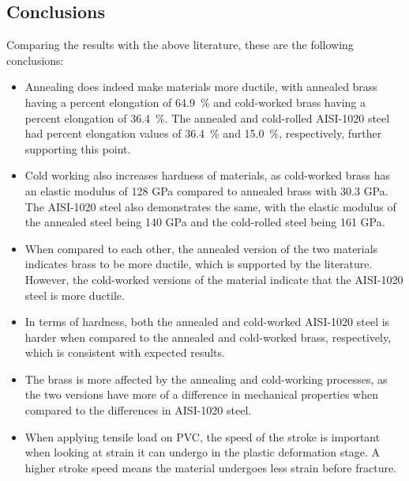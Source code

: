 \documentclass[11pt]{article}
\begin{document}
        \subsection{Conclusions}
            Comparing the results with the above literature, these are the following conclusions:
            \begin{itemize}
                \item 
                Annealing does indeed make materials more ductile, with annealed brass having a percent elongation of \SI{64.9}{\percent} and cold-worked brass having a percent elongation of \SI{36.4}{\percent}. 
                The annealed and cold-rolled AISI-1020 steel had percent elongation values of \SI{36.4}{\percent} and \SI{15.0}{\percent}, respectively, further supporting this point.
                \item 
                Cold working also increases hardness of materials, as cold-worked brass has an elastic modulus of 128 GPa compared to annealed brass with 30.3 GPa. 
                The AISI-1020 steel also demonstrates the same, with the elastic modulus of the annealed steel being 140 GPa and the cold-rolled steel being 161 GPa.
                \item 
                When compared to each other, the annealed version of the two materials indicates brass to be more ductile, which is supported by the literature. 
                However, the cold-worked versions of the material indicate that the AISI-1020 steel is more ductile.
                \item 
                In terms of hardness, both the annealed and cold-worked AISI-1020 steel is harder when compared to the annealed and cold-worked brass, respectively, which is consistent with expected results.
                \item 
                The brass is more affected by the annealing and cold-working processes, as the two versions have more of a difference in mechanical properties when compared to the differences in AISI-1020 steel.
                \item 
                When applying tensile load on PVC, the speed of the stroke is important when looking at strain it can undergo in the plastic deformation stage. 
                A higher stroke speed means the material undergoes less strain before fracture.
            \end{itemize}    
\end{document}
